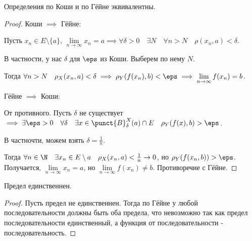 \begin{theorem} \thmslashn

    Определения по Коши и по Гёйне эквивалентны.

    \begin{proof} \thmslashn
    
        Коши $\implies$ Гёйне:

        Пусть $x_{n}\in E \setminus \{a\}$, $\lim\limits_{n \to \infty} x_{n} = a \implies \forall{\delta > 0}\quad \exists{N}\quad \forall{n > N}\quad  \rho(x_{n}, a) < \delta$.

        В частности, у нас $\delta$ для $\eps$ из Коши. Выберем по нему $N$. 

        Тогда $\forall{n > N}\quad \rho_{X}(x_{n}, a) < \delta \implies \rho_{Y}(f(x_{n}), b) < \eps \implies \lim\limits_{n \to \infty} f(x_{n}) = b$.

        Гёйне $\implies$ Коши:

        От противного. Пусть $\delta$ не существует $\implies \exists{\eps > 0}\quad \forall{\delta}\quad \exists{x\in \punct{B}^{X}_{\delta}(a)\cap E }\quad \rho_{Y}(f(x), b) > \eps$.

        В частночти, можем взять $\delta = \frac{1}{n}$.

        Тогда $\forall{n\in \N}\quad \exists{x_{n}\in E \setminus a}\quad \rho_{X}(x_{n}, a) < \frac{1}{n} \to 0$, но $\rho_{Y}(f(x_{n}, b)) > \eps$. Получается, $\lim\limits_{n \to \infty} x_{n} = a$, но $\lim\limits_{n \to \infty} f(x_{n}) \neq b$. Противоречие с Гёйне.


    \end{proof}
\end{theorem}
\begin{consequence} \thmslashn

    Предел единственнен.
    \begin{proof} \thmslashn
    
        Пусть предел не единственнен. Тогда по Гёйне у любой последовательности должны быть оба предела, что невозможно так как предел последовательности единственный, а функция от последовательности - последовательность.
    \end{proof}
\end{consequence}

